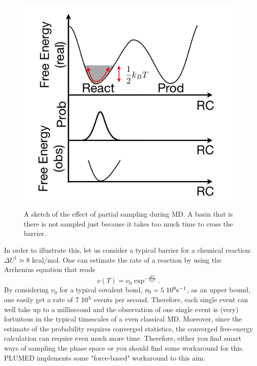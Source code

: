 \documentclass[10pt,fleqn,a4paper]{report}
\begin{document}
\begin{figure}[h!]
\begin{center}
\includegraphics[width=14cm,angle=0]{./figures/partial_conv}
\caption{A sketch of the effect of partial sampling during MD. A basin that is there is not sampled just because it takes too much time to cross the barrier.}
\label{part_conv}
\end{center}
\end{figure} 

In order to illustrate this, let us consider a typical barrier for a chemical reaction: $\Delta U^\ddagger\simeq8$ kcal/mol. One can estimate the rate of a reaction by using the Arrhenius equation that reads
\begin{equation}
\nu(T)=\nu_0\exp^{-\frac{\Delta U^\ddagger}{k_BT} }.
\end{equation}
By considering $\nu_0$ for a typical covalent bond, $\nu_0 \rm =5\ 10^9 s^{-1}$, as an upper bound, one easily get a rate of $\rm 7\ 10^3 $ events per second. Therefore, each single event can well take up to a millisecond and the observation of one single event is (very) fortuitous in the typical timescales of a even classical MD. Moreover, since the estimate of the probability requires converged statistics, the converged free-energy calculation can require even much more time. 
Therefore, either you find smart ways of sampling the phase space or you should find some workaround for this. PLUMED implements some "force-based" workaround to this aim.
%
\end{document}
